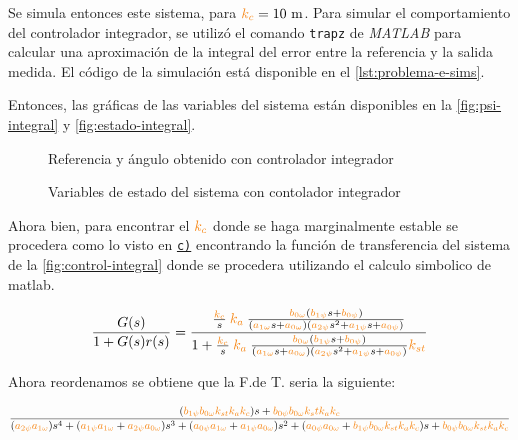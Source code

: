 Se simula entonces este sistema, para $\nara{k_{c}} = 10\ \unit{m}$. Para simular
el comportamiento del controlador integrador, se utilizó el comando \verb|trapz|
de \textit{MATLAB} para calcular una aproximación de la integral del error entre
la referencia y la salida medida. El código de la simulación está disponible en
el \autoref{lst:problema-e-sims}.

Entonces, las gráficas de las variables del sistema están disponibles en la
\autoref{fig:psi-integral} y \autoref{fig:estado-integral}.

\begin{figure}[h]
  \centering
  
  \caption{Referencia y ángulo obtenido con controlador integrador}\label{fig:psi-integral}
\end{figure}

\begin{figure}[h]
  \centering
  
  \caption{Variables de estado del sistema con contolador integrador}\label{fig:estado-integral}
\end{figure}

\FloatBarrier

Ahora bien,  para encontrar el $\nara{k_c}$ donde se haga marginalmente estable se procedera como lo visto en \hyperref[pregunta-c]{\texttt{c)}} encontrando la función de transferencia del sistema de la \autoref{fig:control-integral} donde se procedera utilizando el calculo simbolico de matlab. 

\begin{equation}
  \frac{G(s)}{1 + G(s)r(s)} = \dfrac{\frac{\nara{k_c}}{s}\nara{k_a} \frac{\nara{\nara{b_{0\omega}}}\left(\nara{b_{1\psi}}s + \nara{b_{0\psi}}\right)}
  {\left(\nara{a_{1\omega}}s + \nara{a_{0\omega}}\right)\left(\nara{a_{2\psi}}s^{2} + \nara{a_{1\psi}}s + \nara{a_{0\psi}}\right)}}
  {1+\frac{\nara{k_c}}{s} \nara{k_a} \frac{\nara{\nara{b_{0\omega}}}\left(\nara{b_{1\psi}}s + \nara{b_{0\psi}}\right)}
  {\left(\nara{a_{1\omega}}s + \nara{a_{0\omega}}\right)\left(\nara{a_{2\psi}}s^{2} + \nara{a_{1\psi}}s + \nara{a_{0\psi}}\right)}\nara{k_{st}}}
\end{equation}

Ahora reordenamos se obtiene que la F.de T. seria la siguiente:


\begin{equation}
  \dfrac{(\nara{b_{1\psi} b_{0\omega} k_{st} k_a k_c})s + \nara{b_{0\psi} b_{0\omega}k_st k_a k_c}}
  {(\nara{a_{2\psi} a_{1\omega}}) s^4 +
  (\nara{a_{1\psi} a_{1\omega}} + \nara{a_{2\psi} a_{0\omega}}) s^3 + 
  (\nara{a_{0\psi} a_{1\omega}} + \nara{a_{1\psi} a_{0\omega}}) s^2 + 
  (\nara{a_{0\psi} a_{0\omega}} + \nara{b_{1\psi} b_{0\omega}k_{st} k_a k_c})s+ 
  \nara{b_{0\psi} b_{0\omega} k_{st} k_a k_c}}
\end{equation}

